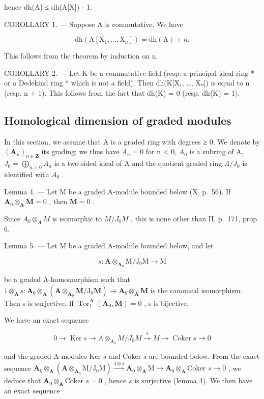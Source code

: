hence dh(A) ≤ dh(A{[}X{]}) - 1.

COROLLARY 1. --- Suppose A is commutative. We have

\[
\mathrm{dh} (\mathrm{A} [ \mathrm{X} _ {1}, \dots , \mathrm{X} _ {n} ]) = \mathrm{dh} (\mathrm{A}) + n.
\]

This follows from the theorem by induction on n.

COROLLARY 2. --- Let K be a commutative field (resp. a principal ideal ring * or a Dedekind ring * which is not a field). Then dh(K{[}X₁, \ldots, Xₙ{]}) is equal to n (resp. n + 1). This follows from the fact that dh(K) = 0 (resp. dh(K) = 1).

\subsection{Homological dimension of graded modules}

In this section, we assume that A is a graded ring with degrees ≥ 0. We denote by \((\mathbf{A}_{n})_{n \in \mathbf{Z}}\) its grading; we thus have \(A_{n} = 0\) for n \textless{} 0, \(A_{0}\) is a subring of A, \(J_{0} = \bigoplus_{n > 0} A_{n}\) is a two-sided ideal of A and the quotient graded ring \(A/J_{0}\) is identified with \(A_{0}\) .

Lemma 4. --- Let M be a graded A-module bounded below (X, p.~56). If \(\mathbf{A}_0\otimes_{\mathbf{A}}\mathbf{M} = 0\) , then \(\mathbf{M} = 0\) .

Since \(A_{0} \otimes_{A} M\) is isomorphic to \(M/J_{0} M\) , this is none other than II, p.~171, prop. 6.

Lemma 5. --- Let M be a graded A-module bounded below, and let

\[
s: \mathbf {A} \otimes_ {\mathbf {A} _ {0}} \mathrm{M} / \mathrm{J} _ {0} \mathrm{M} \rightarrow \mathrm{M}
\]

be a graded A-homomorphism such that \(1 \otimes_{\mathbf{A}} s: \mathbf{A}_0 \otimes_{\mathbf{A}} (\mathbf{A} \otimes_{\mathbf{A}_0} \mathbf{M} / \mathrm{J}_0 \mathbf{M}) \to \mathbf{A}_0 \otimes_{\mathbf{A}} \mathbf{M}\) is the canonical isomorphism. Then s is surjective. If \(\operatorname{Tor}_1^{\mathbf{A}}(\mathbf{A}_0, \mathbf{M}) = 0\) , s is bijective.

We have an exact sequence

\[
0 \rightarrow \operatorname{Ker} s \rightarrow A \otimes_ {A _ {0}} M / J _ {0} M \xrightarrow {s} M \rightarrow \operatorname{Coker} s \rightarrow 0
\]

and the graded A-modules Ker \(s\) and Coker \(s\) are bounded below. From the exact sequence \(\mathbf{A}_{0} \otimes_{\mathbf{A}} (\mathbf{A} \otimes_{\mathbf{A}_{0}} \mathrm{M} / \mathrm{J}_{0} \mathrm{M}) \xrightarrow{1 \otimes s} \mathbf{A}_{0} \otimes_{\mathbf{A}} \mathrm{M} \to \mathbf{A}_{0} \otimes_{\mathbf{A}} \text{Coker } s \to 0\) , we deduce that \(\mathbf{A}_{0} \otimes_{\mathbf{A}} \text{Coker } s = 0\) , hence \(s\) is surjective (lemma 4). We then have an exact sequence

